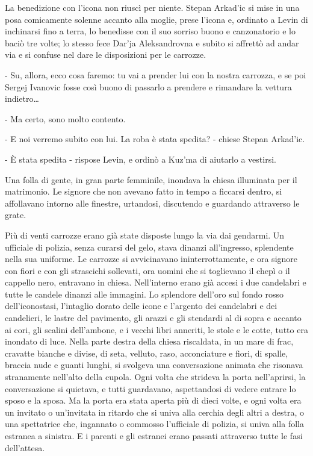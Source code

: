 La benedizione con l'icona non riuscì per niente. Stepan Arkad'ic si mise in una posa comicamente solenne accanto alla moglie, prese l'icona e, ordinato a Levin di inchinarsi fino a terra, lo benedisse con il suo sorriso buono e canzonatorio e lo baciò tre volte; lo stesso fece Dar'ja Aleksandrovna e subito si affrettò ad andar via e si confuse nel dare le disposizioni per le carrozze. 

- Su, allora, ecco cosa faremo: tu vai a prender lui con la nostra carrozza, e se poi Sergej Ivanovic fosse così buono di passarlo a prendere e rimandare la vettura indietro\ldots{} 

- Ma certo, sono molto contento. 

- E noi verremo subito con lui. La roba è stata spedita? - chiese Stepan Arkad'ic. 

- È stata spedita - rispose Levin, e ordinò a Kuz'ma di aiutarlo a vestirsi. 

\label{iii-4} 

Una folla di gente, in gran parte femminile, inondava la chiesa illuminata per il matrimonio. Le signore che non avevano fatto in tempo a ficcarsi dentro, si affollavano intorno alle finestre, urtandosi, discutendo e guardando attraverso le grate. 

Più di venti carrozze erano già state disposte lungo la via dai gendarmi. Un ufficiale di polizia, senza curarsi del gelo, stava dinanzi all'ingresso, splendente nella sua uniforme. Le carrozze si avvicinavano ininterrottamente, e ora signore con fiori e con gli strascichi sollevati, ora uomini che si toglievano il chepì o il cappello nero, entravano in chiesa. Nell'interno erano già accesi i due candelabri e tutte le candele dinanzi alle immagini. Lo splendore dell'oro sul fondo rosso dell'iconostasi, l'intaglio dorato delle icone e l'argento dei candelabri e dei candelieri, le lastre del pavimento, gli arazzi e gli stendardi al di sopra e accanto ai cori, gli scalini dell'ambone, e i vecchi libri anneriti, le stole e le cotte, tutto era inondato di luce. Nella parte destra della chiesa riscaldata, in un mare di frac, cravatte bianche e divise, di seta, velluto, raso, acconciature e fiori, di spalle, braccia nude e guanti lunghi, si svolgeva una conversazione animata che risonava stranamente nell'alto della cupola. Ogni volta che strideva la porta nell'aprirsi, la conversazione si quietava, e tutti guardavano, aspettandosi di vedere entrare lo sposo e la sposa. Ma la porta era stata aperta più di dieci volte, e ogni volta era un invitato o un'invitata in ritardo che si univa alla cerchia degli altri a destra, o una spettatrice che, ingannato o commosso l'ufficiale di polizia, si univa alla folla estranea a sinistra. E i parenti e gli estranei erano passati attraverso tutte le fasi dell'attesa. 

